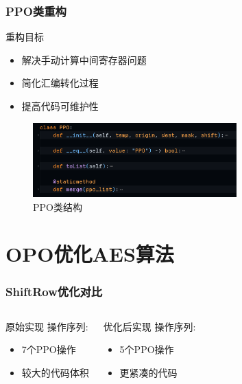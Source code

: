 \documentclass{beamer}
\begin{document}
\begin{frame}
    \frametitle{PPO类重构}
    \begin{block}{重构目标}
        \begin{itemize}
            \item 解决手动计算中间寄存器问题
            \item 简化汇编转化过程
            \item 提高代码可维护性
        \end{itemize}
    \end{block}
    \begin{figure}
        \centering
        \includegraphics[width=0.7\textwidth]{./fig/ppo_class.png}
        \caption{PPO类结构}
    \end{figure}
\end{frame}

\section{OPO优化AES算法}
\begin{frame}
    \frametitle{ShiftRow优化对比}
    \begin{columns}
        \begin{block}{原始实现}
            操作序列:
            \begin{itemize}
                \item 7个PPO操作
                \item 较大的代码体积
            \end{itemize}
        \end{block}
        
        \begin{block}{优化后实现}
            操作序列:
            \begin{itemize}
                \item 5个PPO操作
                \item 更紧凑的代码
            \end{itemize}
        \end{block}
    \end{columns}
\end{frame}
\end{document}
